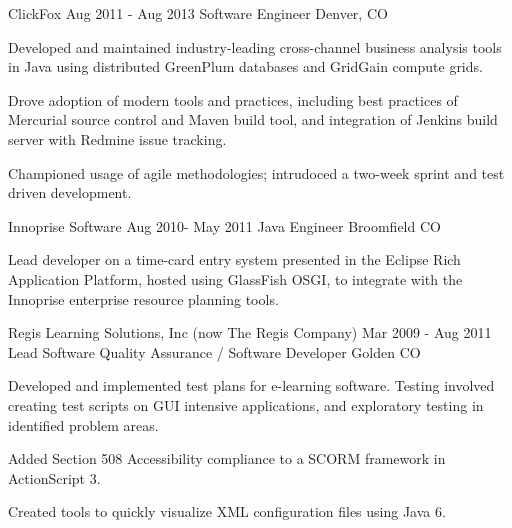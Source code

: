 \documentclass[10pt]{article}
\begin{document}
{	\job
	{ClickFox}
	{Aug 2011 - Aug 2013}
	{Software Engineer}
	{Denver, CO}
	{
	\begin{newitemize}
		\item Developed and maintained industry-leading cross-channel business analysis tools in Java using distributed GreenPlum databases and GridGain compute grids.
		\item Drove adoption of modern tools and practices, including
best practices of Mercurial source control and Maven build tool,
and integration of Jenkins build server with Redmine issue
tracking.
		\item Championed usage of agile methodologies; intrudoced a
two-week sprint and test driven development.
	\end{newitemize}
	}

	\job
	{Innoprise Software}
	{Aug 2010- May 2011}
	{Java Engineer}
	{Broomfield CO}
	{
	\begin{newitemize}
		\item Lead developer on a time-card entry system presented in
the Eclipse Rich Application Platform, hosted using GlassFish
OSGI, to integrate with the Innoprise enterprise resource
planning tools.
	\end{newitemize}
	}

	\job
	{Regis Learning Solutions, Inc (now The Regis Company)}
	{Mar 2009 - Aug 2011}
	{Lead Software Quality Assurance / Software Developer}
	{Golden CO}
	{
	\begin{newitemize}
		\item Developed and implemented test plans for e-learning
software. Testing involved creating test scripts on GUI
intensive applications, and exploratory testing in identified
problem areas.
 		\item Added Section 508 Accessibility compliance to a SCORM
framework in ActionScript 3.
		\item Created tools to quickly visualize XML configuration files
using Java 6.
	\end{newitemize}
	}
}




	
	\ 
\end{document}
